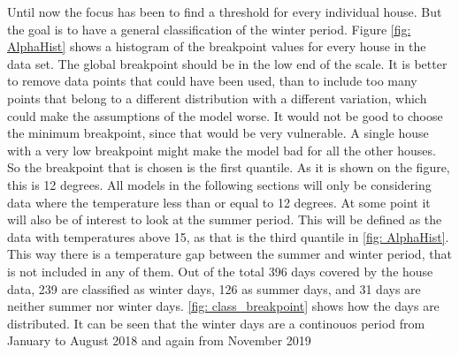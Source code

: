 Until now the focus has been to find a threshold for every individual house. But the goal is to have a general classification of the winter period. Figure \ref{fig: AlphaHist} shows a histogram of the breakpoint values for every house in the data set. The global breakpoint should be in the low end of the scale. It is better to remove data points that could have been used, than to include too many points that belong to a different distribution with a different variation, which could make the assumptions of the model worse. It would not be good to choose the minimum breakpoint, since that would be very vulnerable. A single house with a very low breakpoint might make the model bad for all the other houses. So the breakpoint that is chosen is the first quantile. As it is shown on the figure, this is 12 degrees. All models in the following sections will only be considering data where the temperature less than or equal to 12 degrees. At some point it will also be of interest to look at the summer period. This will be defined as the data with temperatures above 15, as that is the third quantile in \cref{fig: AlphaHist}. This way there is a temperature gap between the summer and winter period, that is not included in any of them. Out of the total 396 days covered by the house data, 239 are classified as winter days, 126 as summer days, and 31 days are neither summer nor winter days. \cref{fig: class_breakpoint} shows how the days are distributed. It can be seen that the winter days are a continouos period from January to August 2018 and again from November 2019
